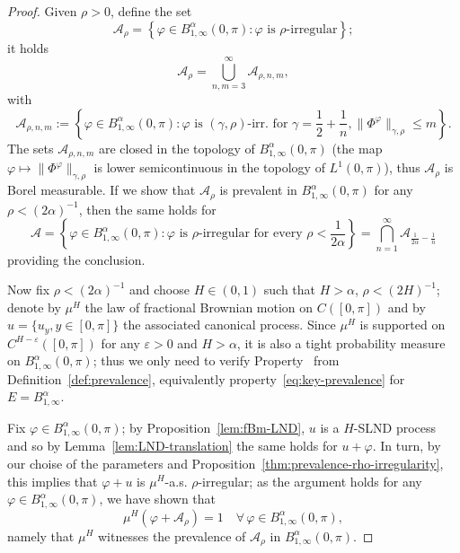\documentclass[11pt,oneside,reqno]{amsart}
\newcommand{\assign}{:=}
\newcommand{\tmtextit}[1]{\text{{\itshape{#1}}}}
\numberwithin{equation}{section}
\begin{document}
\begin{proof}
  Given $\rho > 0$, define the set
  \[ \mathcal{A}_{\rho} = \left\{ \varphi \in B^{\alpha}_{1, \infty} (0, \pi)
     : \varphi \text{ is $\rho$-irregular} \right\} ; \]
  it holds
  \[ \mathcal{A}_{\rho} = \bigcup_{n, m = 3}^{\infty} \mathcal{A}_{\rho, n,
     m}, \]
  with
  \[ \mathcal{A}_{\rho, n, m} \assign \left\{ \varphi \in B^{\alpha}_{1,
     \infty} (0, \pi) : \varphi \text{ is $(\gamma, \rho)$-irr. for } \gamma =
     \frac{1}{2} + \frac{1}{n}, \| \Phi^{\varphi} \|_{\gamma, \rho} \leqslant
     m  \right\} . \]
  The sets $\mathcal{A}_{\rho, n, m}$ are closed in the topology of
  $B^{\alpha}_{1, \infty} (0, \pi)$ (the map $\varphi \mapsto \|
  \Phi^{\varphi} \|_{\gamma, \rho}$ is lower semicontinuous in the topology of
  $L^1 (0, \pi)$), thus $\mathcal{A}_{\rho}$ is Borel measurable. If we show
  that $\mathcal{A}_{\rho}$ is prevalent in $B^{\alpha}_{1, \infty} (0, \pi)$
  for any $\rho < (2 \alpha)^{- 1}$, then the same holds for
  \[ \mathcal{A} = \left\{ \varphi \in B^{\alpha}_{1, \infty} (0, \pi) :
     \varphi \text{ is $\rho$-irregular for every } \rho < \frac{1}{2 \alpha}
     \right\} = \bigcap_{n = 1}^{\infty} \mathcal{A}_{\frac{1}{2 \alpha} -
     \frac{1}{n}} \]
  providing the conclusion.
  
  Now fix $\rho < (2 \alpha)^{- 1}$ and choose $H \in (0, 1)$ such that $H >
  \alpha$, $\rho < (2 H)^{- 1}$; denote by $\mu^H$ the law of fractional
  Brownian motion on $C ([0, \pi])$ and by $u = \{ u_y, y \in [0, \pi] \}$ the
  associated canonical process. Since $\mu^H$ is supported on $C^{H -
  \varepsilon} ([0, \pi])$ for any $\varepsilon > 0$ and $H > \alpha$, it is
  also a tight probability measure on $B^{\alpha}_{1, \infty} (0, \pi)$; thus
  we only need to verify Property~\tmtextit{ii.} from
  Definition~\ref{def:prevalence}, equivalently
  property~\eqref{eq:key-prevalence} for $E = B^{\alpha}_{1, \infty}$.
  
  Fix $\varphi \in B^{\alpha}_{1, \infty} (0, \pi)$; by
  Proposition~\ref{lem:fBm-LND}, $u$ is a $H$-SLND process and so by
  Lemma~\ref{lem:LND-translation} the same holds for $u + \varphi$. In turn,
  by our choise of the parameters and
  Proposition~\ref{thm:prevalence-rho-irregularity}, this implies that
  $\varphi + u$ is $\mu^H$-a.s. $\rho$-irregular; as the argument holds for
  any $\varphi \in B^{\alpha}_{1, \infty} (0, \pi)$, we have shown that
  \[ \mu^H (\varphi + \mathcal{A}_{\rho}) = 1 \quad \forall \, \varphi \in
     B^{\alpha}_{1, \infty} (0, \pi), \]
  namely that $\mu^H$ witnesses the prevalence of $\mathcal{A}_{\rho}$ in
  $B^{\alpha}_{1, \infty} (0, \pi)$.
\end{proof}
\end{document}
